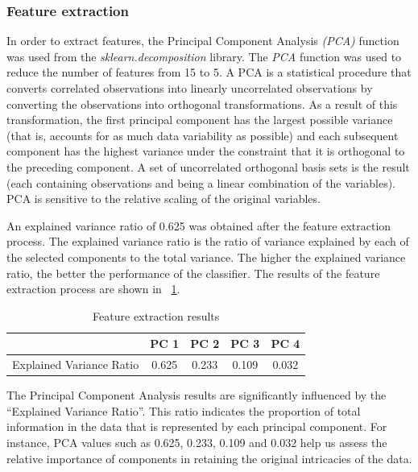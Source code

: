 \documentclass[conference,onecolumn]{IEEEtran}
\begin{document}
        \subsubsection{Feature extraction}
            In order to extract features, the Principal Component Analysis \emph{(PCA)} function was used from the \emph{sklearn.decomposition} library. The \emph{PCA} function was used to reduce the number of features from 15 to 5. A PCA is a statistical procedure that converts correlated observations into linearly uncorrelated observations by converting the observations into orthogonal transformations. As a result of this transformation, the first principal component has the largest possible variance (that is, accounts for as much data variability as possible) and each subsequent component has the highest variance under the constraint that it is orthogonal to the preceding component. A set of uncorrelated orthogonal basis sets is the result (each containing observations and being a linear combination of the variables)\cite{jolliffe2016principal}. PCA is sensitive to the relative scaling of the original variables.


            An explained variance ratio of 0.625 was obtained after the feature extraction process. The explained variance ratio is the ratio of variance explained by each of the selected components to the total variance. The higher the explained variance ratio, the better the performance of the classifier. The results of the feature extraction process are shown in \tablename~\ref{table:featureExtractionResults}.

            \begin{table}[H]
                \centering
                \begin{tabular}{|c|c|c|c|c|}
                    \hline
                    &   PC 1 &   PC 2 &   PC 3 &   PC 4 \\  \hline
                    \hline
                    Explained Variance Ratio   & 0.625   & 0.233   & 0.109   & 0.032   \\
                    \hline
                \end{tabular}
                \caption{Feature extraction results}
                \label{table:featureExtractionResults}
            \end{table}

            The Principal Component Analysis results are significantly influenced by the ``Explained Variance Ratio''. This ratio indicates the proportion of total information in the data that is represented by each principal component. For instance, PCA values such as 0.625, 0.233, 0.109 and 0.032 help us assess the relative importance of components in retaining the original intricacies of the data.
\end{document}
